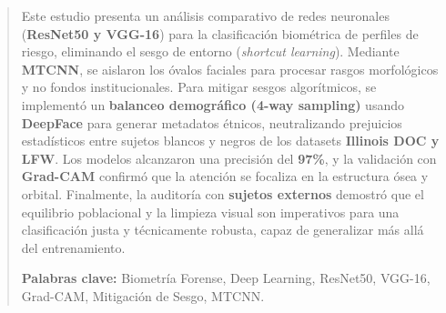 \begin{abstract}
Este estudio presenta un análisis comparativo de redes neuronales (\textbf{ResNet50 y VGG-16}) para la clasificación biométrica de perfiles de riesgo, eliminando el sesgo de entorno (\textit{shortcut learning}). Mediante \textbf{MTCNN}, se aislaron los óvalos faciales para procesar rasgos morfológicos y no fondos institucionales. Para mitigar sesgos algorítmicos, se implementó un \textbf{balanceo demográfico (4-way sampling)} usando \textbf{DeepFace} para generar metadatos étnicos, neutralizando prejuicios estadísticos entre sujetos blancos y negros de los datasets \textbf{Illinois DOC y LFW}. Los modelos alcanzaron una precisión del \textbf{97\%}, y la validación con \textbf{Grad-CAM} confirmó que la atención se focaliza en la estructura ósea y orbital. Finalmente, la auditoría con \textbf{sujetos externos} demostró que el equilibrio poblacional y la limpieza visual son imperativos para una clasificación justa y técnicamente robusta, capaz de generalizar más allá del entrenamiento.

\vspace{0.5em}
\noindent \textbf{Palabras clave:} Biometría Forense, Deep Learning, ResNet50, VGG-16, Grad-CAM, Mitigación de Sesgo, MTCNN.
\end{abstract}
